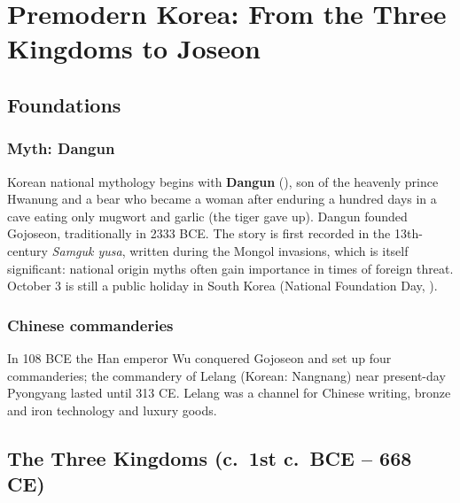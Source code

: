 \chapter{Premodern Korea: From the Three Kingdoms to Joseon}

\section{Foundations}

\subsection{Myth: Dangun}

Korean national mythology begins with \textbf{Dangun} (), son of the heavenly
prince Hwanung and a bear who became a woman after enduring a hundred days in a cave eating
only mugwort and garlic (the tiger gave up). Dangun founded Gojoseon, traditionally in
2333 BCE. The story is first recorded in the 13th-century \emph{Samguk yusa}, written
during the Mongol invasions, which is itself significant: national origin myths often gain
importance in times of foreign threat. October 3 is still a public holiday in South Korea
(National Foundation Day, ).

\subsection{Chinese commanderies}

In 108 BCE the Han emperor Wu conquered Gojoseon and set up four commanderies; the
commandery of Lelang (Korean: Nangnang) near present-day Pyongyang lasted until 313 CE.
Lelang was a channel for Chinese writing, bronze and iron technology and luxury goods.

\section{The Three Kingdoms (c.\ 1st c.\ BCE -- 668 CE)}

